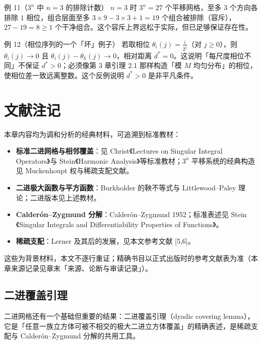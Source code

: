 \documentclass[a4paper,11pt,openany]{ctexbook}
\numberwithin{equation}{chapter}
\numberwithin{figure}{chapter}
\numberwithin{table}{chapter}
\begin{document}
\begin{examplebox}{例 11（$3^n$ 中 $n=3$ 的排除计数）}
$n=3$ 时 $3^n=27$ 个平移网格，至多 $3$ 个方向各排除 $1$ 相位，组合层面至多 $3\times 9-3\times 3+1=19$ 个组合被排除（容斥），$27-19=8\ge1$ 个干净组合。这个容斥上界远松于实际，但已足够保证存在性。
\end{examplebox}

\begin{examplebox}{例 12（相位序列的一个「坏」例子）}
若取相位 $\theta_i(j)=\frac{i}{2^j}$（对 $j\ge0$），则 $\theta_i(j)\to0$ 且 $\theta_i(j)-\theta_h(j)\to0$，相对距离 $d^*=0$。这说明「每尺度相位不同」不保证 $d^*>0$；必须像第 3 章引理 2.1 那样构造「模 $M$ 均匀分布」的相位，使相位差一致远离整数。这个反例说明 $d^*>0$ 是非平凡条件。
\end{examplebox}

\section{文献注记}

本章内容均为调和分析的经典材料，可追溯到标准教材：

\begin{itemize}
\item \textbf{标准二进网格与相邻覆盖}：见 Christ《Lectures on Singular Integral Operators》与 Stein《Harmonic Analysis》等标准教材；$3^n$ 平移系统的经典构造见 Muckenhoupt 权与稀疏支配文献。
\item \textbf{二进极大函数与平方函数}：Burkholder 的鞅不等式与 Littlewood–Paley 理论；二进版本见上述教材。
\item \textbf{Calderón–Zygmund 分解}：Calderón–Zygmund 1952；标准表述见 Stein《Singular Integrals and Differentiability Properties of Functions》。
\item \textbf{稀疏支配}：Lerner 及其后的发展，见本文参考文献 [5,6]。
\end{itemize}

这些为背景材料，本文不逐行重证；精确书目以正式出版时的参考文献表为准（本章来源记录见章末「来源、论断与审读记录」）。

\subsection{二进覆盖引理}

二进网格还有一个基础但重要的结果：二进覆盖引理（dyadic covering lemma），它是「任意一族立方体可被不相交的极大二进立方体覆盖」的精确表述，是稀疏支配与 Calderón–Zygmund 分解的共用工具。
\end{document}
